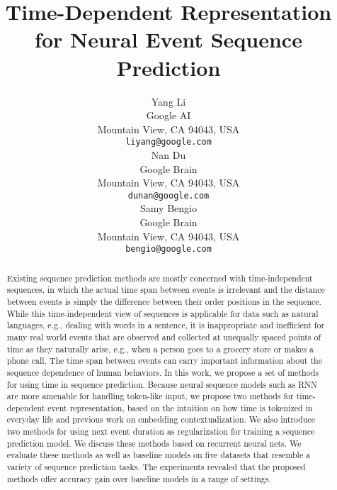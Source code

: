 \documentclass{article} %
\title{Time-Dependent Representation for Neural Event Sequence Prediction}
\author{Yang Li \\
Google AI\\
Mountain View, CA 94043, USA \\
\texttt{liyang@google.com} \\
\And
Nan Du \\
Google Brain \\
Mountain View, CA 94043, USA \\
\texttt{dunan@google.com} \\
\AND
Samy Bengio \\
Google Brain \\
Mountain View, CA 94043, USA \\
\texttt{bengio@google.com}
}
\begin{document}
\maketitle

\begin{abstract}
  Existing sequence prediction methods are mostly concerned with time-independent sequences, in which the actual time span between events is irrelevant and the distance between events is simply the difference between their order positions in the sequence. While this time-independent view of sequences is applicable for data such as natural languages, e.g., dealing with words in a sentence, it is inappropriate and inefficient for many real world events that are observed and collected at unequally spaced points of time as they naturally arise, e.g., when a person goes to a grocery store or makes a phone call. The time span between events can carry important information about the sequence dependence of human behaviors. In this work, we propose a set of methods for using time in sequence prediction. Because neural sequence models such as RNN are more amenable for handling token-like input, we propose two methods for time-dependent event representation, based on the intuition on how time is tokenized in everyday life and previous work on embedding contextualization. We also introduce two methods for using next event duration as regularization for training a sequence prediction model. We discuss these methods based on recurrent neural nets. We evaluate these methods as well as baseline models on five datasets that resemble a variety of sequence prediction tasks. The experiments revealed that the proposed methods offer accuracy gain over baseline models in a range of settings.

\end{abstract}


\end{document}
